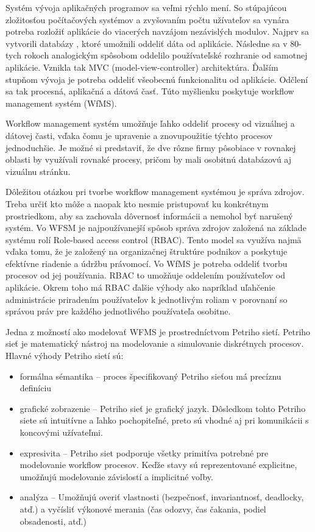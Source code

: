 Systém vývoja aplikačných programov sa veľmi rýchlo mení. So stúpajúcou zložitosťou počítačových systémov a zvyšovaním počtu užívateľov sa vynára potreba rozložiť aplikácie do viacerých navzájom nezávislých modulov. Najprv sa vytvorili databázy , ktoré umožnili oddeliť dáta od aplikácie. Následne sa v 80-tych rokoch analogickým spôsobom  oddelilo používateľské rozhranie od samotnej aplikácie. Vznikla tak MVC (model-view-controller) architektúra. Ďalším stupňom vývoja je potreba oddeliť všeobecnú funkcionalitu od aplikácie. Odčlení sa tak procesná, aplikačná a dátová časť. Túto myšlienku poskytuje workflow management systém (WfMS).

Workflow management systém umožňuje  ľahko oddeliť procesy od vizuálnej a dátovej časti, vďaka čomu je upravenie a znovupoužitie týchto procesov jednoduchšie. Je možné si  predstaviť, že dve rôzne firmy pôsobiace v rovnakej oblasti by využívali rovnaké procesy, pričom by mali osobitnú databázovú aj vizuálnu stránku.

Dôležitou otázkou pri tvorbe workflow management systémou je správa zdrojov. Treba určiť kto môže a naopak kto nesmie pristupovať ku konkrétnym prostriedkom, aby sa zachovala dôvernosť informácii a nemohol byť narušený systém.
Vo WFSM je najpoužívanejší spôsob správa zdrojov založená na základe systému rolí Role-based access control (RBAC). Tento model sa využíva najmä vďaka tomu, že je založený na organizačnej štruktúre podnikov a poskytuje efektívne riadenie a údržbu právomocí. Vo WfMS je potreba oddeliť  tvorbu procesov od jej používania. RBAC to umožňuje oddelením používateľov od aplikácie. Okrem toho má RBAC ďalšie výhody ako napríklad uľahčenie administrácie priradením používateľov k jednotlivým roliam v porovnaní so správou práv pre každého jednotlivého používateľa osobitne. 

Jedna z možností ako modelovať WFMS je prostredníctvom Petriho sietí. Petriho sieť je matematický nástroj na modelovanie a simulovanie diskrétnych procesov.  Hlavné výhody Petriho sietí sú:

\begin{itemize}
	\item formálna sémantika – proces špecifikovaný Petriho sieťou má precíznu definíciu
	\item grafické zobrazenie – Petriho sieť je grafický jazyk. Dôsledkom tohto Petriho siete
	sú intuitívne a ľahko pochopiteľné, preto sú vhodné aj pri komunikácii
	s koncovými užívateľmi.
	\item expresivita – Petriho siet podporuje všetky primitíva potrebné pre modelovanie
	workflow procesov. Keďže stavy sú reprezentované explicitne, umožňujú
	modelovanie závislostí a implicitné voľby.
	\item analýza – Umožňujú overiť vlastnosti (bezpečnosť, invariantnosť, deadlocky, atď.)
	a vyčísliť výkonové merania (čas odozvy, čas čakania, podiel obsadenosti, atď.)
\end{itemize}



